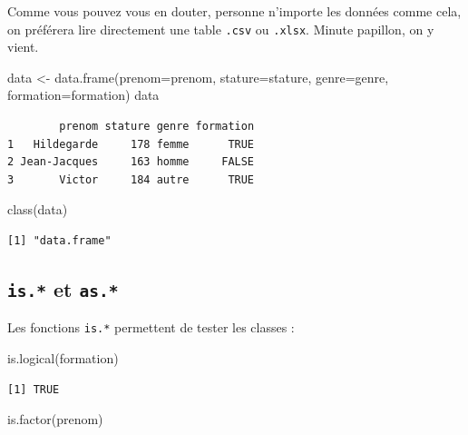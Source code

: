 \documentclass[
  letterpaper,
  DIV=11,
  numbers=noendperiod]{scrreprt}
\newenvironment{Shaded}{\begin{snugshade}}{\end{snugshade}}
\newcommand{\AttributeTok}[1]{\textcolor[rgb]{0.40,0.45,0.13}{#1}}
\newcommand{\FunctionTok}[1]{\textcolor[rgb]{0.28,0.35,0.67}{#1}}
\newcommand{\NormalTok}[1]{\textcolor[rgb]{0.00,0.23,0.31}{#1}}
\newcommand{\OtherTok}[1]{\textcolor[rgb]{0.00,0.23,0.31}{#1}}
\begin{document}
Comme vous pouvez vous en douter, personne n'importe les données comme
cela, on préférera lire directement une table \texttt{.csv} ou
\texttt{.xlsx}. Minute papillon, on y vient.

\begin{Shaded}
\begin{Highlighting}[]
\NormalTok{data }\OtherTok{\textless{}{-}} \FunctionTok{data.frame}\NormalTok{(}\AttributeTok{prenom=}\NormalTok{prenom,}
                   \AttributeTok{stature=}\NormalTok{stature,}
                   \AttributeTok{genre=}\NormalTok{genre,}
                   \AttributeTok{formation=}\NormalTok{formation)}
\NormalTok{data}
\end{Highlighting}
\end{Shaded}

\begin{verbatim}
        prenom stature genre formation
1   Hildegarde     178 femme      TRUE
2 Jean-Jacques     163 homme     FALSE
3       Victor     184 autre      TRUE
\end{verbatim}

\begin{Shaded}
\begin{Highlighting}[]
\FunctionTok{class}\NormalTok{(data)}
\end{Highlighting}
\end{Shaded}

\begin{verbatim}
[1] "data.frame"
\end{verbatim}

\hypertarget{is.-et-as.}{%
\subsection{\texorpdfstring{\texttt{is.*} et
\texttt{as.*}}{is.* et as.*}}\label{is.-et-as.}}

Les fonctions \texttt{is.*} permettent de tester les classes :

\begin{Shaded}
\begin{Highlighting}[]
\FunctionTok{is.logical}\NormalTok{(formation)}
\end{Highlighting}
\end{Shaded}

\begin{verbatim}
[1] TRUE
\end{verbatim}

\begin{Shaded}
\begin{Highlighting}[]
\FunctionTok{is.factor}\NormalTok{(prenom)}
\end{Highlighting}
\end{Shaded}
\end{document}
